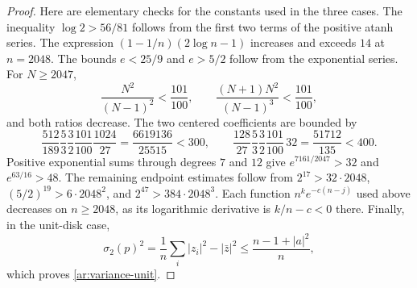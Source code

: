 \begin{proof}
Here are elementary checks for the constants used in the three cases.
The inequality $\log2>56/81$ follows from the first two terms of
the positive atanh series. The expression
$(1-1/n)(2\log n-1)$ increases and exceeds $14$ at $n=2048$.
The bounds $e<25/9$ and $e>5/2$ follow from the exponential series.
For $N\ge2047$,
\[
 \frac{N^2}{(N-1)^2}<\frac{101}{100},\qquad
 \frac{(N+1)N^2}{(N-1)^3}<\frac{101}{100},
\]
and both ratios decrease. The two centered coefficients are bounded by
\[
 \frac{512}{189}\frac53\frac32\frac{101}{100}\frac{1024}{27}
 =\frac{6619136}{25515}<300,
 \qquad
 \frac{128}{27}\frac53\frac32\frac{101}{100}\,32
 =\frac{51712}{135}<400.
\]
Positive exponential sums through degrees $7$ and $12$ give
$e^{7161/2047}>32$ and $e^{63/16}>48$.
The remaining endpoint estimates follow from
$2^{17}>32\cdot2048$,
$(5/2)^{19}>6\cdot2048^2$, and
$2^{47}>384\cdot2048^3$.
Each function $n^ke^{-c(n-j)}$ used above decreases on $n\ge2048$,
as its logarithmic derivative is $k/n-c<0$ there.
Finally, in the unit-disk case,
\[
 \sigma_2(p)^2=\frac1n\sum_i|z_i|^2-|\bar z|^2
 \le\frac{n-1+|a|^2}{n},
\]
which proves \eqref{ar:variance-unit}.
\end{proof}
